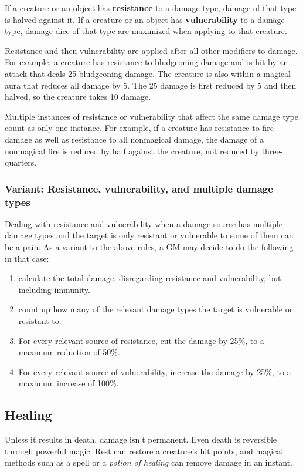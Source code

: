 If a creature or an object has \textbf{resistance} to a damage type, damage of that type is halved against it. If a creature or an object has \textbf{vulnerability} to a damage type, damage dice of that type are maximized when applying to that creature.

Resistance and then vulnerability are applied after all other modifiers to damage. For example, a creature has resistance to bludgeoning damage and is hit by an attack that deals 25 bludgeoning damage. The creature is also within a magical aura that reduces all damage by 5. The 25 damage is first reduced by 5 and then halved, so the creature takes 10 damage.

Multiple instances of resistance or vulnerability that affect the same damage type count as only one instance. For example, if a creature has resistance to fire damage as well as resistance to all nonmagical damage, the damage of a nonmagical fire is reduced by half against the creature, not reduced by three-quarters.

\subsubsection{Variant: Resistance, vulnerability, and multiple damage types}
Dealing with resistance and vulnerability when a damage source has multiple damage types and the target is only resistant or vulnerable to some of them can be a pain. As a variant to the above rules, a GM may decide to do the following in that case:
\begin{enumerate}
    \item calculate the total damage, disregarding resistance and vulnerability, but including immunity.
    \item count up how many of the relevant damage types the target is vulnerable or resistant to.
    \item For every relevant source of resistance, cut the damage by 25\%, to a maximum reduction of 50\%.
    \item For every relevant source of vulnerability, increase the damage by 25\%, to a maximum increase of 100\%.
\end{enumerate}

\subsection{Healing}

Unless it results in death, damage isn't permanent. Even death is reversible through powerful magic. Rest can restore a creature's hit points, and magical methods such as a  spell or a \textit{potion of healing} can remove damage in an instant.

